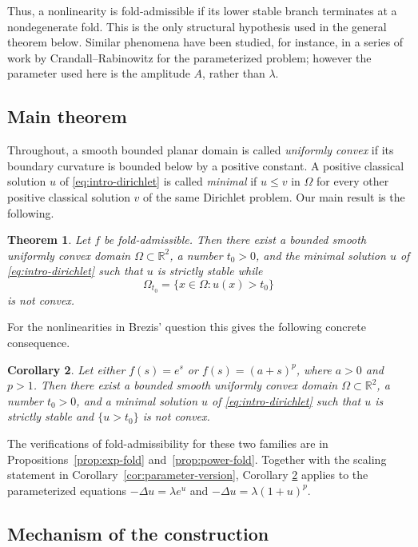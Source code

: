 \documentclass[reqno,12pt]{amsart}
\numberwithin{equation}{section}
\newtheorem{theorem}{Theorem}[section]
\newtheorem{corollary}[theorem]{Corollary}
\theoremstyle{remark}
\begin{document}
Thus, a nonlinearity is fold-admissible if  its lower stable branch terminates at a nondegenerate fold.  This is the only structural hypothesis used in the general theorem below. Similar phenomena have been studied, for instance,  in a series of work by Crandall--Rabinowitz \cite{CR1973,CR1975} for the parameterized
problem; however the parameter used here is the amplitude $A$, rather than $\lambda$. 

\subsection{Main theorem}

Throughout, a smooth bounded planar domain is called \emph{uniformly convex} if its boundary curvature is bounded below by a positive constant.
A positive classical solution $u$ of \eqref{eq:intro-dirichlet} is called
\emph{minimal} if $u\le v$ in $\Omega$ for every other positive classical
solution $v$ of the same Dirichlet problem.  Our main result is the following.

\begin{theorem}\label{thm:main}
Let $f$ be fold-admissible.  Then there exist a bounded smooth uniformly convex
domain $\Omega\subset\mathbb R^2$, a number $t_0>0$, and the minimal solution $u$
of \eqref{eq:intro-dirichlet} such that $u$ is strictly stable while
$$
        \Omega_{t_0}=\{x\in\Omega:u(x)>t_0\}
$$
is not convex.
\end{theorem}

For the nonlinearities in Brezis' question this gives the following concrete
consequence.

\begin{corollary}\label{cor:model}
Let either $f(s)=e^s$ or $f(s)=(a+s)^p$, where $a>0$ and $p>1$.  Then there
exist a bounded smooth uniformly convex domain $\Omega\subset\mathbb R^2$, a
number $t_0>0$, and a minimal solution $u$ of \eqref{eq:intro-dirichlet} such
that $u$ is strictly stable and $\{u>t_0\}$ is not convex.
\end{corollary}

 The verifications of fold-admissibility for these two families  are in Propositions~\ref{prop:exp-fold} and~\ref{prop:power-fold}.  Together with the
scaling statement in Corollary~\ref{cor:parameter-version}, Corollary
\ref{cor:model} applies to the parameterized equations
$-\Delta u=\lambda e^u$ and $-\Delta u=\lambda(1+u)^p$.

\subsection{Mechanism of the construction}
\end{document}
